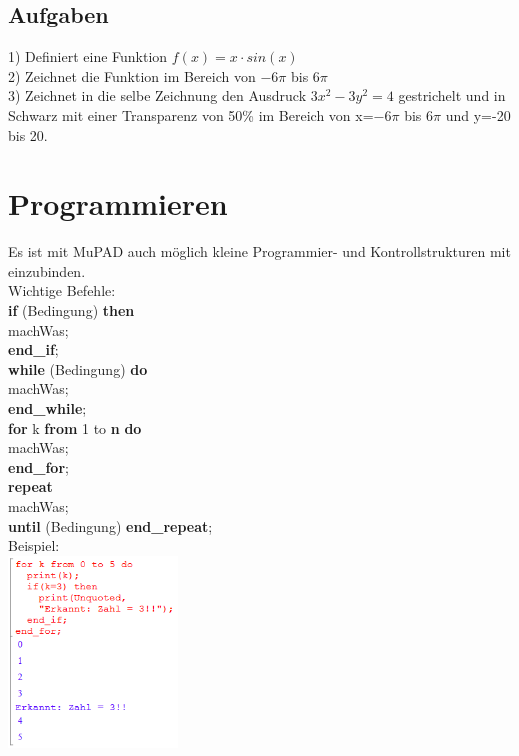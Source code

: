 \documentclass[11pt,final]{scrreprt}
\begin{document}
\subsection{Aufgaben}
1) Definiert eine Funktion $f(x) = x\cdot sin(x)$\\
2) Zeichnet die Funktion im Bereich von $-6\pi$ bis $6\pi$\\
3) Zeichnet in die selbe Zeichnung den Ausdruck $3x^2-3y^2=4$ gestrichelt und in Schwarz mit einer Transparenz von 50\% im Bereich von x=$-6\pi$ bis $6\pi$ und y=-20 bis 20.\\

\section{Programmieren}

Es ist mit MuPAD auch möglich kleine Programmier- und Kontrollstrukturen mit einzubinden.\\
Wichtige Befehle:\\

\textbf{if} (Bedingung) \textbf{then}\\
\hspace*{1em} machWas;\\
\textbf{end\_if};\\

\textbf{while} (Bedingung) \textbf{do}\\
\hspace*{1em} machWas;\\
\textbf{end\_while};\\

\textbf{for} k \textbf{from} 1 to \textbf{n} \textbf{do}\\
\hspace*{1em} machWas;\\
\textbf{end\_for};\\

\textbf{repeat}\\
\hspace*{1em} machWas;\\
\textbf{until} (Bedingung) \textbf{end\_repeat};\\

Beispiel:\\

\includegraphics[width = 170px]{images/program_1}
\end{document}
